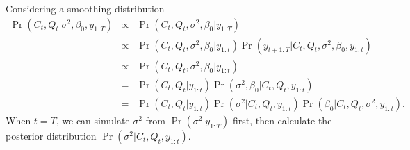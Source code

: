 \documentclass[12pt,a4paper,twoside]{article}
\begin{document}
Considering a smoothing distribution
\begin{eqnarray*}
\Pr(C_t,Q_t|\sigma^2, \beta_0,y_{1:T}) &\propto& 
\Pr(C_t,Q_t,\sigma^2,\beta_0|y_{1:T}) \\
&\propto& \Pr(C_t,Q_t,\sigma^2,\beta_0|y_{1:t})
\Pr(y_{t+1:T}|C_t,Q_t,\sigma^2,\beta_0,y_{1:t}) \\
&\propto& \Pr(C_t,Q_t,\sigma^2,\beta_0|y_{1:t}) \\
&=& \Pr(C_t,Q_t|y_{1:t})\Pr(\sigma^2,\beta_0|C_t,Q_t,y_{1:t}) \\
&=& \Pr(C_t,Q_t|y_{1:t})\Pr(\sigma^2|C_t,Q_t,y_{1:t})
\Pr(\beta_0|C_t,Q_t,\sigma^2,y_{1:t}).
\end{eqnarray*}
When $t=T$, we can simulate $\sigma^2$ from $\Pr(\sigma^2|y_{1:T})$ first, 
then calculate the posterior distribution $\Pr(\sigma^2|C_t,Q_t,y_{1:t})$.
\end{document}
